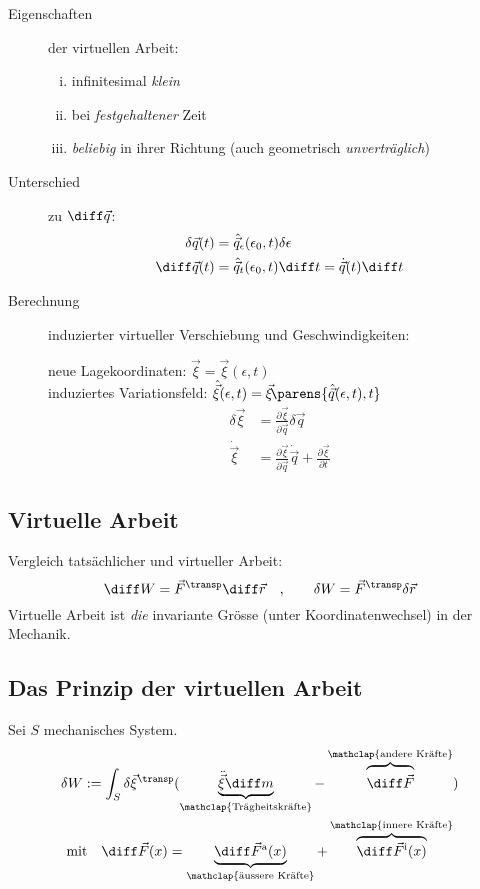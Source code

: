 		\begin{description}
			\item[Eigenschaften] der virtuellen Arbeit:
				\begin{enumerate}[(i)]
					\item infinitesimal \emph{klein}
					\item bei \emph{festgehaltener} Zeit
					\item \emph{beliebig} in ihrer Richtung (auch geometrisch \emph{unverträglich})
				\end{enumerate}
			
			\item[Unterschied] zu $\diff \vec q$:
				\begin{align*}
					\delta \vec q(t) &= \hat{\vec q}_\epsilon(\epsilon_0,t)\delta\epsilon \\
					\diff \vec q(t) &= \hat{\vec q}_t(\epsilon_0,t)\diff t = \dot{\vec q}(t) \diff t
				\end{align*}
			
			\item[Berechnung] induzierter virtueller Verschiebung und Geschwindigkeiten:
		
				neue Lagekoordinaten: $\vec\xi = \vec\xi(\epsilon,t)$ \\
				induziertes Variationsfeld: $\hat{\vec\xi}(\epsilon,t) = \vec\xi\!\parens{\hat{\vec q}(\epsilon,t),t}$
				\begin{align*}
					\delta\vec\xi &= \frac{\partial\vec\xi}{\partial\vec q}\delta\vec q \\
					\dot{\vec \xi} &= \frac{\partial \vec\xi}{\partial\vec q}\dot{\vec q} + \frac{\partial \vec \xi}{\partial t}  
				\end{align*}
		\end{description}
	
	\subsection{Virtuelle Arbeit} %
		Vergleich tatsächlicher und virtueller Arbeit:
		\[
			\diff W = \vec F^\transp \diff \vec r \quad, \qquad \delta W = \vec F^\transp \delta \vec r
		\]
		Virtuelle Arbeit ist \emph{die} invariante Grösse (unter Koordinatenwechsel) in der Mechanik.
	
	\subsection{Das Prinzip der virtuellen Arbeit} %
		Sei $S$ mechanisches System.
		\begin{gather*}
			\delta W := \int_S \delta \vec\xi^\transp (
				\underbrace{
					\ddot{\vec\xi}\diff m
				}_{\mathclap{\text{Trägheitskräfte}}}
				-
				\overbrace{ \vphantom{\ddot{\vec\xi}}
					\diff \vec F
				}^{\mathclap{\text{andere Kräfte}}}
			) \\
			\text{mit} \quad \diff \vec F(x) = \underbrace{
				\diff \vec F^\text{a}(x)
			}_{\mathclap{\text{äussere Kräfte}}}
			+
			\overbrace{
				\diff \vec F^\text{i}(x)
			}^{\mathclap{\text{innere Kräfte}}}
		\end{gather*}
		
